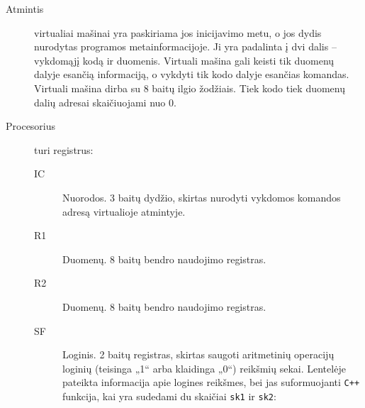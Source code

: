 \begin{description}
  \item[Atmintis] virtualiai mašinai yra paskiriama jos inicijavimo metu,
    o jos dydis nurodytas programos metainformacijoje.
    Ji yra padalinta į dvi dalis – vykdomąjį kodą ir duomenis. Virtuali
    mašina gali keisti tik duomenų dalyje esančią informaciją, o vykdyti
    tik kodo dalyje esančias komandas. Virtuali mašina dirba su 
    8 baitų ilgio žodžiais. Tiek kodo tiek duomenų dalių adresai 
    skaičiuojami nuo 0.
  \item[Procesorius] turi registrus:
    \begin{description}
      \item[IC] Nuorodos. 3 baitų dydžio, skirtas nurodyti vykdomos komandos
        adresą virtualioje atmintyje.
      \item[R1] Duomenų. 8 baitų bendro naudojimo registras.
      \item[R2] Duomenų. 8 baitų bendro naudojimo registras.
      \item[SF] Loginis. 2 baitų registras, skirtas saugoti aritmetinių operacijų 
        loginių (teisinga „1“ arba klaidinga „0“) reikšmių sekai. Lentelėje
        pateikta informacija apie logines reikšmes, bei jas suformuojanti
        \verb|C++| funkcija, kai yra sudedami du skaičiai \verb|sk1| ir
        \verb|sk2|:


\end{description}
\end{description}
